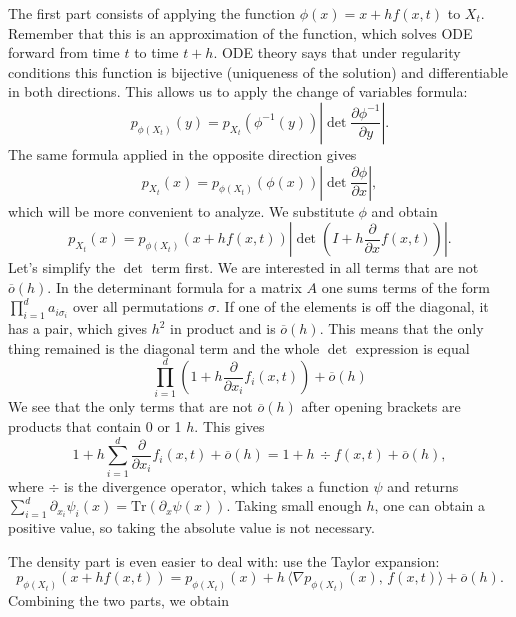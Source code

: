 The first part consists of applying the function $\phi(x) = x + h f(x, t)$ to $X_t$. Remember that this is an approximation of the function, which solves ODE forward from time $t$ to time $t + h$. ODE theory says that under regularity conditions this function is bijective (uniqueness of the solution) and differentiable in both directions. This allows us to apply the change of variables formula:
\[
    p_{\phi(X_t)}(y) = p_{X_t}(\phi^{-1}(y)) \left| \det \frac{\partial \phi^{-1}}{\partial y} \right|.
\]
The same formula applied in the opposite direction gives
\[
    p_{X_t}(x) = p_{\phi(X_t)}(\phi(x)) \left| \det \frac{\partial{\phi}}{\partial x} \right|,
\]
which will be more convenient to analyze. We substitute $\phi$ and obtain
\[
    p_{X_t}(x) = p_{\phi(X_t)}\left(x + h f(x, t)\right) \left|\det \left(I + h \frac{\partial}{\partial x} f(x, t)\right) \right|.
\]
Let's simplify the $\det$ term first. We are interested in all terms that are not $\overline{o}(h)$. In the determinant formula for a matrix $A$ one sums terms of the form $\prod_{i = 1}^{d} a_{i \sigma_i}$ over all permutations $\sigma$. If one of the elements is off the diagonal, it has a pair, which gives $h^2$ in product and is $\overline{o}(h)$. This means that the only thing remained is the diagonal term and the whole $\det$ expression is equal
\[
    \prod\limits_{i = 1}^{d} \left(1 + h \frac{\partial}{\partial x_i} f_i(x, t)\right) + \overline{o}(h)
\]
We see that the only terms that are not $\overline{o}(h)$ after opening brackets are products that contain 0 or 1 $h$. This gives
\[
    1 + h \sum\limits_{i = 1}^{d} \frac{\partial}{\partial x_i} f_i(x, t) + \overline{o}(h) = 1 + h\, \div f(x, t) + \overline{o}(h),
\]
where $\div$ is the divergence operator, which takes a function $\psi$ and returns $\sum_{i = 1}^{d} \partial_{x_i} \psi_i(x) = \mathrm{Tr}( \partial_x \psi(x))$. Taking small enough $h$, one can obtain a positive value, so taking the absolute value is not necessary.

The density part is even easier to deal with: use the Taylor expansion:
\[
    p_{\phi(X_t)}(x + h f(x, t)) = p_{\phi(X_t)}(x) + h\, \Big\langle \nabla p_{\phi(X_t)}(x), \, f(x, t) \Big\rangle + \overline{o}(h).
\]
Combining the two parts, we obtain



